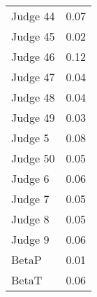 \begin{tabular}{lr}
 Judge 44 &      0.07 \\
 Judge 45 &      0.02 \\
 Judge 46 &      0.12 \\
 Judge 47 &      0.04 \\
 Judge 48 &      0.04 \\
 Judge 49 &      0.03 \\
  Judge 5 &      0.08 \\
 Judge 50 &      0.05 \\
  Judge 6 &      0.06 \\
  Judge 7 &      0.05 \\
  Judge 8 &      0.05 \\
  Judge 9 &      0.06 \\
    BetaP &      0.01 \\
    BetaT &      0.06 \\
\bottomrule
\end{tabular}
